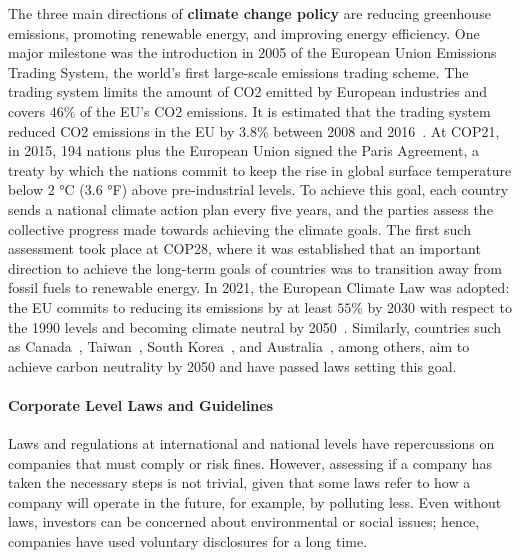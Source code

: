 The three main directions of \textbf{climate change policy} are reducing greenhouse emissions, promoting renewable energy, and improving energy efficiency. One major milestone was the introduction in 2005 of the European Union Emissions Trading System, the world's first large-scale emissions trading scheme. The trading system limits the amount of CO2 emitted by European industries and covers $46\%$ of the EU's CO2 emissions. It is estimated that the trading system reduced CO2 emissions in the EU by $3.8\%$ between 2008 and 2016~\cite{bayer2020european}. At COP21, in 2015, 194 nations plus the European Union signed the Paris Agreement, a treaty by which the nations commit to keep the rise in global surface temperature below 2 °C (3.6 °F) above pre-industrial levels. To achieve this goal, each country sends a national climate action plan every five years, and the parties assess the collective progress made towards achieving the climate goals. 
The first such assessment took place at COP28, where it was established that an important direction to achieve the long-term goals of countries was to transition away from fossil fuels to renewable energy. In 2021, the European Climate Law was adopted: the EU commits to reducing its emissions by at least $55\%$ by 2030 with respect to the 1990 levels and becoming climate neutral by 2050~\cite{euclimatelaw}. 
Similarly, countries such as Canada~\cite{canadaclimatelaw}, Taiwan~\cite{taiwanclimatelaw}, South Korea~\cite{koreaclimatelaw}, and Australia~\cite{australiaclimatelaw}, among others, aim to achieve carbon neutrality by 2050 and have passed laws setting this goal.

\paragraph{Corporate Level Laws and Guidelines} Laws and regulations at international and national levels have repercussions on companies that must comply or risk fines. However, assessing if a company has taken the necessary steps is not trivial, given that some laws refer to how a company will operate in the future, for example, by polluting less. Even without laws, investors can be concerned about environmental or social issues; hence, companies have used voluntary disclosures for a long time.  

